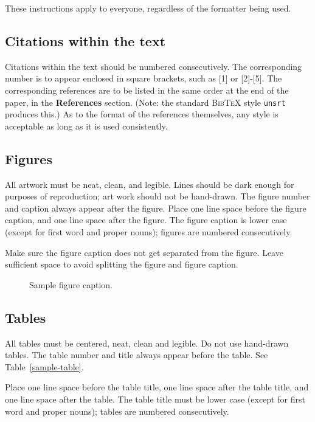 \documentclass{article} %
\begin{document}
These instructions apply to everyone, regardless of the formatter being used.

\subsection{Citations within the text}

Citations within the text should be numbered consecutively. The corresponding
number is to appear enclosed in square brackets, such as [1] or [2]-[5]. The
corresponding references are to be listed in the same order at the end of the
paper, in the \textbf{References} section. (Note: the standard
\textsc{Bib\TeX} style \texttt{unsrt} produces this.) As to the format of the
references themselves, any style is acceptable as long as it is used
consistently.

\subsection{Figures}

All artwork must be neat, clean, and legible. Lines should be dark
enough for purposes of reproduction; art work should not be
hand-drawn. The figure number and caption always appear after the
figure. Place one line space before the figure caption, and one line
space after the figure. The figure caption is lower case (except for
first word and proper nouns); figures are numbered consecutively.

Make sure the figure caption does not get separated from the figure.
Leave sufficient space to avoid splitting the figure and figure caption.

\begin{figure}[h]
\begin{center}
\fbox{\rule[-.5cm]{0cm}{4cm} \rule[-.5cm]{4cm}{0cm}}
\end{center}
\caption{Sample figure caption.}
\end{figure}

\subsection{Tables}

All tables must be centered, neat, clean and legible. Do not use hand-drawn
tables. The table number and title always appear before the table. See
Table~\ref{sample-table}.

Place one line space before the table title, one line space after the table
title, and one line space after the table. The table title must be lower case
(except for first word and proper nouns); tables are numbered consecutively.
\end{document}
